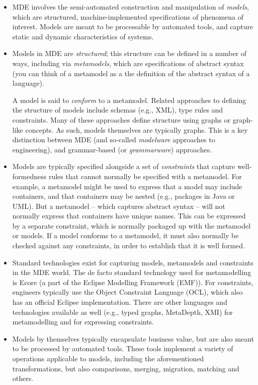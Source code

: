 \begin{itemize}
\item MDE involves the semi-automated construction and manipulation of \textit{models}, which are structured, machine-implemented specifications of phenomena of interest. Models are meant to be processable by automated tools, and capture static and dynamic characteristics of systems. 

\item Models in MDE are \textit{structured}; this structure can be defined in a number of ways, including via \textit{metamodels}, which are specifications of abstract syntax (you can think of a metamodel as a the definition of the abstract syntax of a language). 

A model is said to \textit{conform} to a metamodel. Related approaches to defining the structure of models include schemas (e.g., XML), type rules and constraints. Many of these approaches define structure using graphs or graph-like concepts. As such, models themselves are typically graphs. This is a key distinction between MDE (and so-called \textit{modelware} approaches to engineering), and grammar-based (or \textit{grammarware}) approaches.

\item Models are typically specified alongside a set of \textit{constraints} that capture well-formedness rules that cannot normally be specified with a metamodel. For example, a metamodel might be used to express that a model may include containers, and that containers may be nested (e.g., packages in Java or UML). But a metamodel -- which captures abstract syntax -- will not normally express that containers have unique names. This can be expressed by a separate constraint, which is normally packaged up with the metamodel or models. If a model conforms to a metamodel, it must also normally be checked against any constraints, in order to establish that it is well formed.

\item Standard technologies exist for capturing models, metamodels and constraints in the MDE world. The de facto standard technology used for metamodelling is Ecore (a part of the Eclipse Modelling Framework (EMF)). For constraints, engineers typically use the Object Constraint Language (OCL), which also has an official Eclipse implementation. There are other languages and technologies available as well (e.g., typed graphs, MetaDepth, XMI) for metamodelling and for expressing constraints.

\item Models by themselves typically encapsulate business value, but are also meant to be processed by automated tools. These tools implement a variety of operations applicable to models, including the aforementioned transformations, but also comparisons, merging, migration, matching and others.
\end{itemize}

